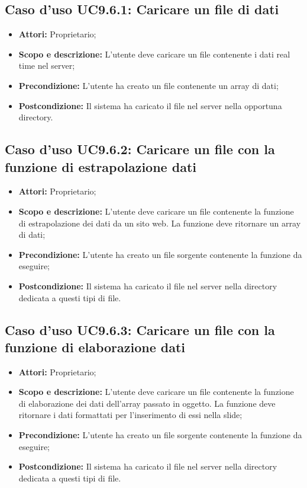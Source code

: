 	\subsection{Caso d'uso UC9.6.1: Caricare un file di dati}
	\begin{itemize}
		\item \textbf{Attori:} Proprietario;
		\item \textbf{Scopo e descrizione:} L'utente deve caricare un file contenente i dati \gls{real time} nel server;
		\item \textbf{Precondizione:} L'utente ha creato un file contenente un array di dati;
		\item \textbf{Postcondizione:} Il sistema ha caricato il file nel server nella opportuna directory.
	\end{itemize}

	\subsection{Caso d'uso UC9.6.2: Caricare un file con la funzione di estrapolazione dati}
	\begin{itemize}
		\item \textbf{Attori:} Proprietario;
		\item \textbf{Scopo e descrizione:} L'utente deve caricare un file contenente la funzione di estrapolazione dei dati da un sito web. La funzione deve ritornare un array di dati;
		\item \textbf{Precondizione:} L'utente ha creato un file sorgente contenente la funzione da eseguire;
		\item \textbf{Postcondizione:} Il sistema ha caricato il file nel server nella directory dedicata a questi tipi di file.
	\end{itemize}
	
	\subsection{Caso d'uso UC9.6.3: Caricare un file con la funzione di elaborazione dati}
	\begin{itemize}
		\item \textbf{Attori:} Proprietario;
		\item \textbf{Scopo e descrizione:} L'utente deve caricare un file contenente la funzione di elaborazione dei dati dell'array passato in oggetto. La funzione deve ritornare i dati formattati per l'inserimento di essi nella \gls{slide};
		\item \textbf{Precondizione:} L'utente ha creato un file sorgente contenente la funzione da eseguire;
		\item \textbf{Postcondizione:} Il sistema ha caricato il file nel server nella directory dedicata a questi tipi di file.
	\end{itemize}
	
